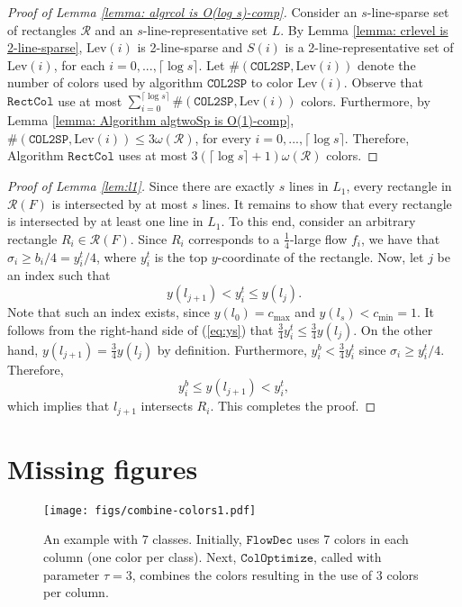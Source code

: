 \documentclass[a4paper,UKenglish]{lipics-v2016}
\theoremstyle{plain}
\newcommand{\cmax}{c_{\max}}
\newcommand{\cR}{\mathcal{R}}
\newcommand{\algtwoSp}{\mathtt{COL2SP}}
\newcommand{\algrcol}{\mathtt{RectCol}}
\begin{document}
\begin{proof}[Proof of Lemma \ref{lemma: algrcol is O(log s)-comp}]
Consider an $s$-line-sparse set of rectangles $\cR$ and an $s$-line-representative set $L$.
By Lemma \ref{lemma: crlevel is 2-line-sparse}, $\mathrm{Lev}(i)$ is 2-line-sparse and $S(i)$ is a 2-line-representative set of $\mathrm{Lev}(i)$, for each $i=0,...,\lceil \log s\rceil$. Let $\#(\algtwoSp, \mathrm{Lev}(i))$ denote the number of colors used by algorithm $\algtwoSp$ to color $\mathrm{Lev}(i)$. Observe that $\algrcol$ use at most $\sum_{i=0}^{\lceil \log s\rceil} \#(\algtwoSp, \mathrm{Lev}(i))$
colors. Furthermore, by Lemma \ref{lemma: Algorithm algtwoSp is O(1)-comp}, $\#(\algtwoSp, \mathrm{Lev}(i)) \leq 3\omega(\cR)$, for every $i=0,...,\lceil \log s\rceil$. Therefore, Algorithm $\algrcol$ uses at most $3(\lceil\log s\rceil+1)\omega(\cR)$ colors.
\end{proof}

\begin{proof}[Proof of Lemma \ref{lem:l1}]
Since there are exactly $s$ lines in $L_1$, every rectangle in $\cR(F)$ is intersected by at most  $s$ lines. It remains to show that every rectangle is intersected by at least one line in $L_1$. To this end, consider an arbitrary rectangle $R_i\in\cR(F)$. Since $R_i$ corresponds to a $\frac{1}{4}$-large flow $f_i$, we have that $\sigma_i\geq b_i/4= y_i^t/4$, where $y^t_i$ is the top $y$-coordinate of the rectangle. Now, let $j$ be an index such that 
\begin{equation} \label{eq:ys}
y(l_{j+1}) < y_i^t\leq y(l_j). 
\end{equation}
Note that such an index exists, since $y(l_0)=\cmax$ and $y(l_s) < c_{\min}=1$.
It follows from the right-hand side of (\ref{eq:ys}) that $\frac{3}{4} y_i^t \leq \frac{3}{4} y(l_j)$. On the other hand, $y(l_{j+1})=\frac{3}{4} y(l_j)$ by definition. Furthermore, $y_i^b < \frac{3}{4} y_i^t $ since $\sigma_i \geq y_i^t/4$. Therefore, 
\[
y_i^b\leq y(l_{j+1}) < y_i^t, 
\]
which implies that $l_{j+1}$ intersects $R_i$. This completes the proof.
\end{proof}


\clearpage
\section{Missing figures}
\label{Appendix:sec:figs}
\begin{figure}[h]
\begin{center}
\texttt{[image: figs/combine-colors1.pdf]}
\caption{ \label{fig:combine-colors}
An example with $7$ classes. Initially, $\mathtt{FlowDec}$ uses 7 colors in each column (one color per class). Next, $\mathtt{ColOptimize}$, called with parameter $\tau=3$, combines the colors resulting in the use of $3$ colors per column.
}
\end{center}
\end{figure}
\end{document}
